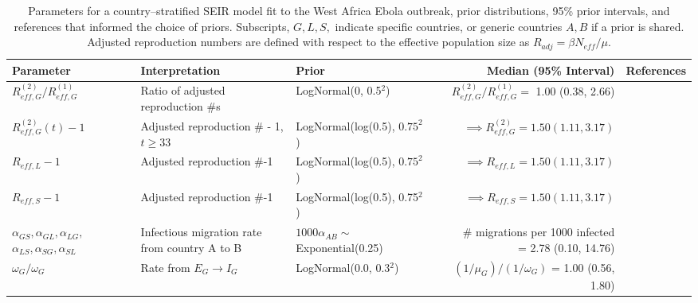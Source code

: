 \begin{table}
	\begin{fullpage}
		\caption[Parameters and priors for a country--stratified SEIR model fit to the West Africa Ebola outbreak.]{Parameters for a country--stratified SEIR model fit to the West Africa Ebola outbreak, prior distributions, 95\% prior intervals, and references that informed the choice of priors. Subscripts, $ G,L,S, $ indicate specific countries, or generic countries $ A,B $ if a prior is shared. Adjusted reproduction numbers are defined with respect to the effective population size as $ R_{adj} = \beta N_{eff} /\mu $.}
		\label{tab:ebola_priors_joint_tight}
		\scriptsize
		\centering
		\begin{tabular}{lllrr}
			\hline
			\textbf{Parameter} &  \textbf{Interpretation} & \textbf{Prior} & \textbf{Median (95\% Interval)} & \textbf{References} \\ \hline
			$ R_{eff,G}^{(2)} / R_{eff,G}^{(1)} $ & Ratio of adjusted reproduction \#s &  LogNormal(0, 0.5$ ^2 $) & $ R_{eff,G}^{(2)} / R_{eff,G}^{(1)} = $ 1.00 (0.38, 2.66) & \cite{chowell2014transmission,chretien2015mathematical,coltart2017ebola,king2015avoidable} \\
			$ R_{eff,G}^{(2)}(t)-1 $ & Adjusted reproduction \# - 1, $ t\geq33 $ & LogNormal(log(0.5), $ 0.75^2 $) & $ \implies R_{eff,G}^{(2)} = 1.50 (1.11, 3.17)$ &  \cite{chowell2014transmission,chretien2015mathematical,coltart2017ebola,king2015avoidable} \\
			$ R_{eff,L} -1 $ & Adjusted reproduction \#-1 &  LogNormal(log(0.5), $ 0.75^2 $) & $ \implies R_{eff,L} = 1.50 (1.11, 3.17)$ &  \cite{chowell2014transmission,chretien2015mathematical,coltart2017ebola,king2015avoidable} \\
			$ R_{eff,S}-1 $ & Adjusted reproduction \#-1 & LogNormal(log(0.5), 0.75$ ^2 $) & $ \implies R_{eff,S} = 1.50 (1.11, 3.17)$ &  \cite{chowell2014transmission,chretien2015mathematical,coltart2017ebola,king2015avoidable}\\
			\makecell[l]{$ \alpha_{GS},\alpha_{GL}, \alpha_{LG},$\\
			$ \alpha_{LS},\alpha_{SG}, \alpha_{SL} $} & \makecell[l]{Infectious migration rate \\ from country A to B} & $ 1000\alpha_{AB} \sim$ Exponential(0.25) & \makecell[r]{\# migrations per 1000 infected \\ = 2.78 (0.10, 14.76)} & \cite{dudas2017virus}\\ 
			$ \omega_G/\omega_G $ & Rate from $ E_G\rightarrow I_G $ & LogNormal(0.0, 0.3$ ^2 $) & $ (1/\mu_G)\big/(1/\omega_G) $ = 1.00 (0.56, 1.80) & \cite{chowell2014transmission,velasquez2015time,glynn2017variability} \\

\end{tabular}
\end{fullpage}
\end{table}
